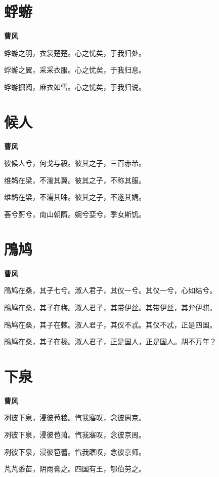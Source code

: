 \documentclass[12pt,a4paper]{ctexbook}
\begin{document}
\section{蜉蝣}
\textbf{曹风}\par\vspace{0.5em}
蜉蝣之羽，衣裳楚楚。心之忧矣，于我归处。\par
蜉蝣之翼，采采衣服。心之忧矣，于我归息。\par
蜉蝣掘阅，麻衣如雪。心之忧矣，于我归说。\par

\section{候人}
\textbf{曹风}\par\vspace{0.5em}
彼候人兮，何戈与祋。彼其之子，三百赤芾。\par
维鹈在梁，不濡其翼。彼其之子，不称其服。\par
维鹈在梁，不濡其咮。彼其之子，不遂其媾。\par
荟兮蔚兮，南山朝隮。婉兮娈兮，季女斯饥。\par

\section{鳲鸠}
\textbf{曹风}\par\vspace{0.5em}
鳲鸠在桑，其子七兮。淑人君子，其仪一兮。其仪一兮，心如结兮。\par
鳲鸠在桑，其子在梅。淑人君子，其带伊丝。其带伊丝，其弁伊骐。\par
鳲鸠在桑，其子在棘。淑人君子，其仪不忒。其仪不忒，正是四国。\par
鳲鸠在桑，其子在榛。淑人君子，正是国人，正是国人。胡不万年？\par

\section{下泉}
\textbf{曹风}\par\vspace{0.5em}
冽彼下泉，浸彼苞稂。忾我寤叹，念彼周京。\par
冽彼下泉，浸彼苞萧。忾我寤叹，念彼京周。\par
冽彼下泉，浸彼苞蓍。忾我寤叹，念彼京师。\par
芃芃黍苗，阴雨膏之。四国有王，郇伯劳之。\par
\end{document}
